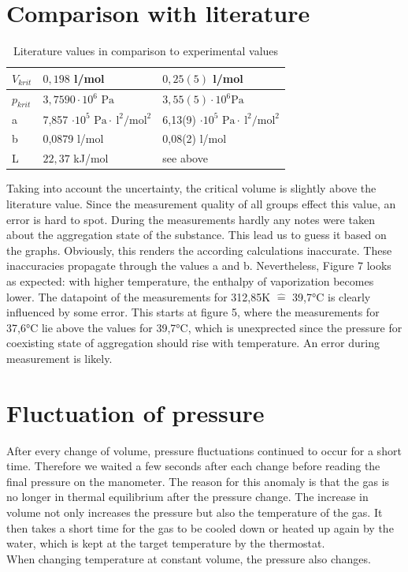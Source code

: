 \documentclass[10pt,a4paper]{article}
\begin{document}
\section{Comparison with literature}
\begin{table}[]
\centering
\begin{tabular}{|l|l|l|}
\hline
$V_{krit}$ & $0,198$ l/mol \cite{data} & $0,25(5)$ l/mol \\ 
\hline 
$p_{krit}$ & $3,7590 \cdot 10^6  \textrm{ Pa}$  & $3,55(5) \cdot 10^6 \textrm{Pa}$ \\ 
\hline 
a & 7,857 $\cdot 10^5  \textrm{ Pa} \cdot \ \textrm{l}^2 / \textrm{mol}^2$ \cite{handbook} & 6,13(9) $\cdot 10^5 \textrm{ Pa} \cdot \ \textrm{l}^2 / \textrm{mol}^2$ \\ 
\hline 
b & 0,0879 l/mol \cite{handbook} & 0,08(2) l/mol \\ 
\hline 
L & $ 22,37$ kJ/mol \cite{handbook} & see above \\ 
 \hline
\end{tabular}
\caption{Literature values in comparison to experimental values}
\end{table}
Taking into account the uncertainty, the critical volume is slightly above the literature value. Since the measurement quality of all groups effect this value, an error is hard to spot. During the measurements hardly any notes were taken about the aggregation state of the substance. This lead us to guess it based on the graphs. Obviously, this renders the according calculations inaccurate. These inaccuracies propagate through the values a and b. Nevertheless, Figure 7 looks as expected: with higher temperature, the enthalpy of vaporization becomes lower. The datapoint of the measurements for 312,85K $\widehat{=}$ 39,7°C is clearly influenced by some error. This starts at figure 5, where the measurements for 37,6°C lie above the values for 39,7°C, which is unexprected since the pressure for coexisting state of aggregation should rise with temperature. An error during measurement is likely.



\section{Fluctuation of pressure}

After every change of volume, pressure fluctuations continued to occur for a short time. Therefore we waited a few seconds after each change before reading the final pressure on the manometer.
The reason for this anomaly is that the gas is no longer in thermal equilibrium after the pressure change.
The increase in volume not only increases the pressure but also the temperature of the gas.
It then takes a short time for the gas to be cooled down or heated up again by the water, which is kept at the target temperature by the thermostat. \\
When changing temperature at constant volume, the pressure also changes.
\end{document}
